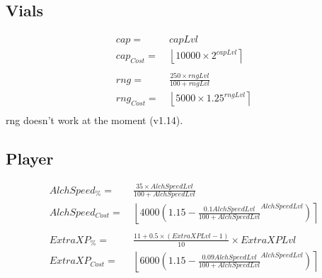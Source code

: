         \subsection{Vials}
            \begin{align*}
                cap =  &\ capLvl
                \\ 
                cap_{Cost} = &\ 
                    \left\lfloor 
                        10000 \times 2^{capLvl}
                    \right\rceil 
                \\ 
                \\
                rng = &\  \frac{250 \times rngLvl}{100+rngLvl}
                \\ 
                rng_{Cost} = &\ 
                    \left\lfloor 
                        5000 \times 1.25^{rngLvl}
                    \right\rceil 
                \\ 
            \end{align*}
             rng doesn't work at the moment (v1.14). 
        \subsection{Player}
            \begin{align*}
                AlchSpeed_\% = &\ \frac{35 \times AlchSpeedLvl}{100+AlchSpeedLvl} 
                \\ 
                AlchSpeed_{Cost} = &\ 
                    \left\lfloor 
                        4000\left(1.15-\frac{0.1AlchSpeedLvl}{100+AlchSpeedLvl}^{AlchSpeedLvl}\right) 
                    \right\rceil 
                \\ 
                \\
                ExtraXP_\% = &\ \frac{11 + 0.5 \times (ExtraXPLvl-1)}{10} \times ExtraXPLvl
                \\
                ExtraXP_{Cost} = &\ 
                \left\lfloor 
                    6000\left(1.15-\frac{0.09AlchSpeedLvl}{100+AlchSpeedLvl}^{AlchSpeedLvl}\right) 
                \right\rceil 
            \end{align*}
